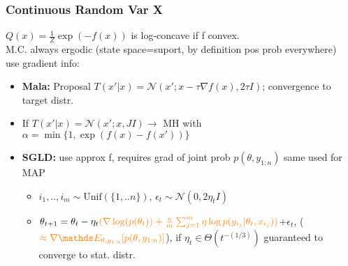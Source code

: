 \subsubsection{Continuous Random Var X}
$Q(x) = \frac{1}{Z}\exp(-f(x))$ is log-concave if f convex.\\
M.C. always ergodic (state space=suport, by definition pos prob everywhere)\\
use gradient info:
\begin{itemize}
	\item \textbf{Mala:} Proposal $T(x'|x) = \mathcal{N}(x'; x-\tau \nabla f(x), 2 \tau I)$; convergence to target distr.
	\item If $T(x'|x) = \mathcal{N}(x'; x, JI) \rightarrow$ MH with $\alpha =
	\min\{1,\exp(f(x)-f(x'))\}$
	\item \textbf{SGLD:} use approx f, requires grad of joint prob $p(\theta, y_{1:n})$ same used for MAP
	\begin{itemize}
		\item $i_{1},..,i_{m} \sim \text{Unif}(\{1,..n\})$, $\epsilon_{t} \sim \mathcal{N}(0, 2\eta_{t}I)$
		\item $\theta_{t+1} = \theta_{t}-\eta_{t}\color{orange}(\nabla \log(p(\theta_{t})) +
		\frac{n}{m} \sum_{j=1}^{m} \eta \log p(y_{i_{j}}|\theta_{t}, x_{i_{j}}))$$+ \epsilon_{t}$,
		($\color{orange} \approx \nabla \E[\theta, y_{1:n}]{p(\theta, y_{1:n})}$),
		if $\eta_{t} \in \Theta(t^{-(1/3)})$ guaranteed to converge to stat. distr.
	\end{itemize}
\end{itemize}




